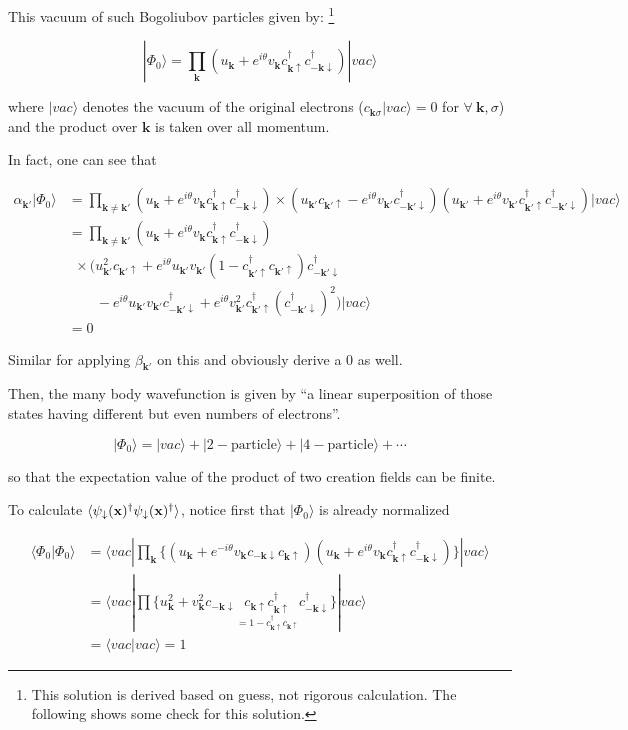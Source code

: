 This vacuum of such Bogoliubov particles given by: \footnote{This solution is derived based on guess, not rigorous calculation. The following shows some check for this solution. }

\[|\Phi_0\rangle = \prod_{\bm{k}}(u_{\bm{k}}+e^{i\theta}v_{\bm{k}}c_{\bm{k}\uparrow}^\dagger c_{-\bm{k}\downarrow}^\dagger)|vac\rangle \]

where $|vac\rangle$ denotes the vacuum of the original electrons ($c_{\bm{k}\sigma}|vac\rangle = 0$ for $\forall\ \bm{k},\sigma$) and the product over $\bm{k}$ is taken over all momentum. 

In fact, one can see that 

\[
\begin{split}
\alpha_{\bm{k}'}|\Phi_0\rangle &= \prod_{\bm{k} \neq \bm{k}'} (u_{\bm{k}}+e^{i\theta}v_{\bm{k}}c_{\bm{k}\uparrow}^\dagger c_{-\bm{k}\downarrow}^\dagger)\times( u_{\bm{k}'}c_{\bm{k}'\uparrow} - e^{i\theta}v_{\bm{k}'}c_{-\bm{k}'\downarrow}^\dagger)(u_{\bm{k}'}+e^{i\theta}v_{\bm{k}'}c_{\bm{k}'\uparrow}^\dagger c_{-\bm{k}'\downarrow}^\dagger)|vac\rangle \\
&=\prod_{\bm{k}\neq\bm{k}'}(u_{\bm{k}}+e^{i\theta}v_{\bm{k}}c_{\bm{k}\uparrow}^\dagger c_{-\bm{k}\downarrow}^\dagger)\\
&\ \ \times (u_{\bm{k}'}^2c_{\bm{k}'\uparrow}+e^{i\theta}u_{\bm{k}'}v_{\bm{k}'}(1-c_{\bm{k}'\uparrow}^\dagger c_{\bm{k}'\uparrow})c_{-\bm{k}'\downarrow}^\dagger\\
&\quad\quad -e^{i\theta}u_{\bm{k}'}v_{\bm{k}'}c_{-\bm{k}'\downarrow}^\dagger + e^{i\theta}v_{\bm{k}'}^2c_{\bm{k}'\uparrow}^\dagger(c_{-\bm{k}'\downarrow}^\dagger)^2)|vac\rangle\\
&=0
\end{split}\]

Similar for applying $\beta_{\bm{k}'}$ on this and obviously derive a $0$ as well. 

Then, the many body wavefunction is given by ``a linear superposition of those states having different but even numbers of electrons''. 

\[|\Phi_0\rangle = |vac\rangle + |2-\text{particle}\rangle + |4-\text{particle}\rangle+\cdots \]

so that the expectation value of the product of two creation fields can be finite. 

To calculate $\langle\psi_{\downarrow}(\bf{x})^\dagger\psi_{\downarrow}(\bf{x})^\dagger\rangle$, notice first that $|\Phi_0\rangle$ is already normalized

\[\begin{split}
\langle\Phi_0|\Phi_0\rangle &= \langle vac| \prod_{\bm{k}}\{(u_{\bm{k}}+e^{-i\theta}v_{\bm{k}}c_{-\bm{k}\downarrow}c_{\bm{k}\uparrow})(u_{\bm{k}}+e^{i\theta}v_{\bm{k}}c_{\bm{k}\uparrow}^\dagger c_{-\bm{k}\downarrow}^\dagger)\}|vac\rangle\\
&= \langle vac|\prod\{u_{\bm{k}}^2+v_{\bm{k}}^2c_{-\bm{k}\downarrow}\underset{=1-c_{\bm{k}\uparrow}^\dagger c_{\bm{k}\uparrow}}{c_{\bm{k}\uparrow}c_{\bm{k}\uparrow}^\dagger} c_{-\bm{k}\downarrow}^\dagger\}|vac\rangle\\
&=\langle vac|vac\rangle = 1
\end{split}\]

